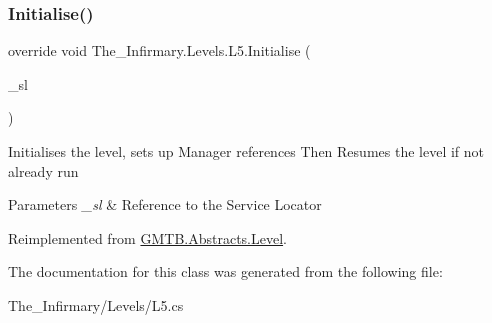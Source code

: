 \subsubsection{\texorpdfstring{Initialise()}{Initialise()}}
{\footnotesize\ttfamily override void The\+\_\+\+Infirmary.\+Levels.\+L5.\+Initialise (\begin{DoxyParamCaption}\item[{\mbox{\hyperlink{interface_g_m_t_b_1_1_interfaces_1_1_i_service_locator}{I\+Service\+Locator}}}]{\+\_\+sl }\end{DoxyParamCaption})\hspace{0.3cm}{\ttfamily [virtual]}}



Initialises the level, sets up Manager references Then Resumes the level if not already run 


\begin{DoxyParams}{Parameters}
{\em \+\_\+sl} & Reference to the Service Locator \\
\hline
\end{DoxyParams}


Reimplemented from \mbox{\hyperlink{class_g_m_t_b_1_1_abstracts_1_1_level_a0048401bb0fb66b0fb0c19b3b25e4265}{G\+M\+T\+B.\+Abstracts.\+Level}}.



The documentation for this class was generated from the following file\+:\begin{DoxyCompactItemize}
\item 
The\+\_\+\+Infirmary/\+Levels/L5.\+cs\end{DoxyCompactItemize}
